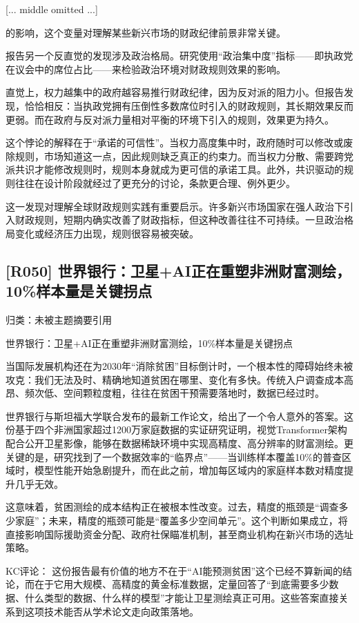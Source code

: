 \documentclass[11pt]{ctexart}
\begin{document}
[... middle omitted ...]

的影响，这个变量对理解某些新兴市场的财政纪律前景非常关键。

报告另一个反直觉的发现涉及政治格局。研究使用“政治集中度”指标——即执政党在议会中的席位占比——来检验政治环境对财政规则效果的影响。

直觉上，权力越集中的政府越容易推行财政纪律，因为反对派的阻力小。但报告发现，恰恰相反：当执政党拥有压倒性多数席位时引入的财政规则，其长期效果反而更弱。而在政府与反对派力量相对平衡的环境下引入的规则，效果更为持久。

这个悖论的解释在于“承诺的可信性”。当权力高度集中时，政府随时可以修改或废除规则，市场知道这一点，因此规则缺乏真正的约束力。而当权力分散、需要跨党派共识才能修改规则时，规则本身就成为更可信的承诺工具。此外，共识驱动的规则往往在设计阶段就经过了更充分的讨论，条款更合理、例外更少。

这一发现对理解全球财政规则实践有重要启示。许多新兴市场国家在强人政治下引入财政规则，短期内确实改善了财政指标，但这种改善往往不可持续。一旦政治格局变化或经济压力出现，规则很容易被突破。

\subsection{[R050] 世界银行：卫星+AI正在重塑非洲财富测绘，10\%样本量是关键拐点}
{\small\color{refgray}归类：未被主题摘要引用}

世界银行：卫星+AI正在重塑非洲财富测绘，10\%样本量是关键拐点

当国际发展机构还在为2030年“消除贫困”目标倒计时，一个根本性的障碍始终未被攻克：我们无法及时、精确地知道贫困在哪里、变化有多快。传统入户调查成本高昂、频次低、空间颗粒度粗，往往在贫困干预需要落地时，数据已经过时。

世界银行与斯坦福大学联合发布的最新工作论文，给出了一个令人意外的答案。这份基于四个非洲国家超过1200万家庭数据的实证研究证明，视觉Transformer架构配合公开卫星影像，能够在数据稀缺环境中实现高精度、高分辨率的财富测绘。更关键的是，研究找到了一个数据效率的“临界点”——当训练样本覆盖10\%的普查区域时，模型性能开始急剧提升，而在此之前，增加每区域内的家庭样本数对精度提升几乎无效。

这意味着，贫困测绘的成本结构正在被根本性改变。过去，精度的瓶颈是“调查多少家庭”；未来，精度的瓶颈可能是“覆盖多少空间单元”。这个判断如果成立，将直接影响国际援助资金分配、政府社保瞄准机制，甚至商业机构在新兴市场的选址策略。

KC评论： 这份报告最有价值的地方不在于“AI能预测贫困”这个已经不算新闻的结论，而在于它用大规模、高精度的黄金标准数据，定量回答了“到底需要多少数据、什么类型的数据、什么样的模型”才能让卫星测绘真正可用。这些答案直接关系到这项技术能否从学术论文走向政策落地。
\end{document}
